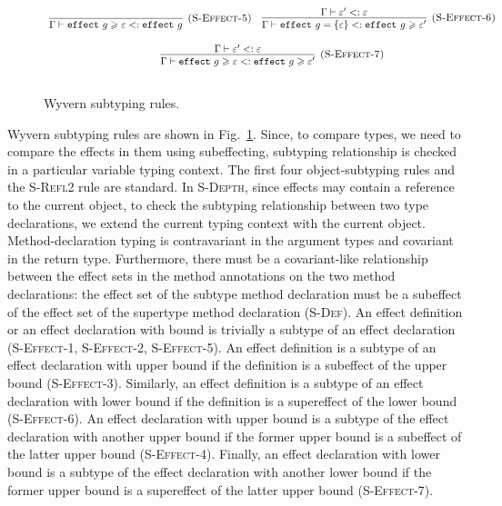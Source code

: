 \begin{figure}[!t]
{\[\begin{array}{c}
\infer[\textsc{(S-Effect-5)}]
  {\Gamma  \vdash \keyw{effect} g \geqslant \varepsilon <: \keyw{effect} g}
  {}\quad 
  
\infer[\textsc{(S-Effect-6)}]
  {\Gamma  \vdash \keyw{effect} g = \{\varepsilon\} <: \keyw{effect} g \geqslant \varepsilon'}
  {\Gamma  \vdash \varepsilon' <: \varepsilon}\\[3ex]
  
\infer[\textsc{(S-Effect-7)}]
  {\Gamma  \vdash \keyw{effect} g \geqslant \varepsilon <: \keyw{effect} g \geqslant \varepsilon'}
  {\Gamma  \vdash \varepsilon' <: \varepsilon}\\[3ex]
\end{array}
\]
}
\caption{Wyvern subtyping rules.}
\label{f-effects-subtyping-rules}
\end{figure}

Wyvern subtyping rules are shown in Fig.~\ref{f-effects-subtyping-rules}. Since, to compare types, we need to compare the effects in them using subeffecting, subtyping relationship is checked in a particular variable typing context. The first four object-subtyping rules and the \textsc{S-Refl2} rule are standard. In \textsc{S-Depth}, since effects may contain a reference to the current object, to check the subtyping relationship between two type declarations, we extend the current typing context with the current object. Method-declaration typing is contravariant in the argument types and covariant in the return type. Furthermore, there must be a covariant-like relationship between the effect sets in the method annotations on the two method declarations: the effect set of the subtype method declaration must be a subeffect of the effect set of the supertype method declaration (\textsc{S-Def}). An effect definition or an effect declaration with bound is trivially a subtype of an effect declaration (\textsc{S-Effect-1, S-Effect-2, S-Effect-5}). An effect definition is a subtype of an effect declaration with upper bound if the definition is a subeffect of the upper bound (\textsc{S-Effect-3)}. Similarly, an effect definition is a subtype of an effect declaration with lower bound if the definition is a supereffect of the lower bound (\textsc{S-Effect-6)}. An effect declaration with upper bound is a subtype of the effect declaration with another upper bound if the former upper bound is a subeffect of the latter upper bound (\textsc{S-Effect-4}). Finally, an effect declaration with lower bound is a subtype of the effect declaration with another lower bound if the former upper bound is a supereffect of the latter upper bound (\textsc{S-Effect-7}).

